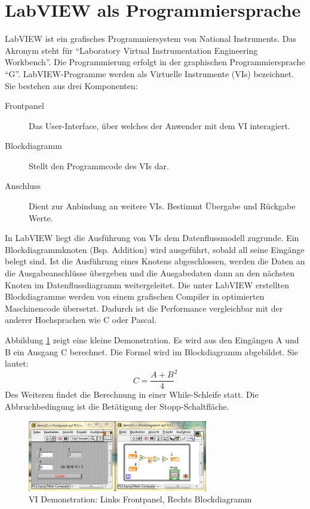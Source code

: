 \section{LabVIEW als Programmiersprache}
	\label{sec:labview}
	
LabVIEW ist ein grafisches Programmiersystem von National Instruments. Das Akronym steht für "`Laboratory Virtual Instrumentation Engineering Workbench"'.
Die Programmierung erfolgt in der graphischen Programmiersprache "`G"'.  LabVIEW-Programme werden als Virtuelle Instrumente (VIs) bezeichnet. \cite{ni-tuto} %
Sie bestehen aus drei Komponenten: 
\begin{description}
	\item[Frontpanel] Das User-Interface, über welches der Anwender mit dem VI interagiert.
	\item[Blockdiagramm] Stellt den Programmcode des VIs dar.
	\item[Anschluss] Dient zur Anbindung an weitere VIs. Bestimmt Übergabe und Rückgabe Werte. 
\end{description}

In LabVIEW liegt die Ausführung von VIs dem Datenflussmodell zugrunde. Ein Blockdiagrammknoten (Bsp. Addition) wird ausgeführt, sobald all seine Eingänge belegt sind. Ist die Ausführung eines Knotens abgeschlossen, werden die Daten an die Ausgabeanschlüsse übergeben und die Ausgabedaten dann an den nächsten Knoten im Datenflussdiagramm weitergeleitet. \cite{labview-buch01}
Die unter LabVIEW erstellten Blockdiagramme werden von einem grafischen Compiler in optimierten Maschinencode übersetzt. Dadurch ist die Performance vergleichbar mit der anderer Hochsprachen wie C oder Pascal. \cite{ni-compiler}

Abbildung \ref{fig:demo01} zeigt eine kleine Demonstration. Es wird aus den Eingängen A und B ein Ausgang C berechnet. Die Formel wird im Blockdiagramm abgebildet. Sie lautet:
\[ C = \frac{A+B}{4}^{2} \]
Des Weiteren findet die Berechnung in einer While-Schleife statt. Die Abbruchbedingung ist die Betätigung der Stopp-Schaltfläche. 

	\begin{figure}%
	\centering
		\includegraphics[width=0.7\textwidth]{Pics/demo01.png}
	\caption{VI Demonstration: Links Frontpanel, Rechts Blockdiagramm}
	\label{fig:demo01}
	\end{figure}

